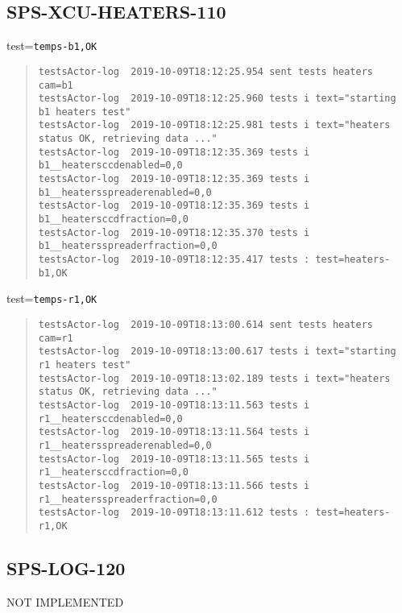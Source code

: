 \subsection{SPS-XCU-HEATERS-110}
\label{sec:tc-110}

test=\texttt{temps-b1,OK}

\begin{quote}
\begin{tiny}
\begin{verbatim}
testsActor-log  2019-10-09T18:12:25.954 sent tests heaters cam=b1
testsActor-log  2019-10-09T18:12:25.960 tests i text="starting b1 heaters test"
testsActor-log  2019-10-09T18:12:25.981 tests i text="heaters status OK, retrieving data ..."
testsActor-log  2019-10-09T18:12:35.369 tests i b1__heatersccdenabled=0,0
testsActor-log  2019-10-09T18:12:35.369 tests i b1__heatersspreaderenabled=0,0
testsActor-log  2019-10-09T18:12:35.369 tests i b1__heatersccdfraction=0,0
testsActor-log  2019-10-09T18:12:35.370 tests i b1__heatersspreaderfraction=0,0
testsActor-log  2019-10-09T18:12:35.417 tests : test=heaters-b1,OK
\end{verbatim}
\end{tiny}
\end{quote}

\noindent test=\texttt{temps-r1,OK}

\begin{quote}
\begin{tiny}
\begin{verbatim}
testsActor-log  2019-10-09T18:13:00.614 sent tests heaters cam=r1
testsActor-log  2019-10-09T18:13:00.617 tests i text="starting r1 heaters test"
testsActor-log  2019-10-09T18:13:02.189 tests i text="heaters status OK, retrieving data ..."
testsActor-log  2019-10-09T18:13:11.563 tests i r1__heatersccdenabled=0,0
testsActor-log  2019-10-09T18:13:11.564 tests i r1__heatersspreaderenabled=0,0
testsActor-log  2019-10-09T18:13:11.565 tests i r1__heatersccdfraction=0,0
testsActor-log  2019-10-09T18:13:11.566 tests i r1__heatersspreaderfraction=0,0
testsActor-log  2019-10-09T18:13:11.612 tests : test=heaters-r1,OK
\end{verbatim}
\end{tiny}
\end{quote}

\subsection{SPS-LOG-120}
\label{sec:tc-120}
NOT IMPLEMENTED


